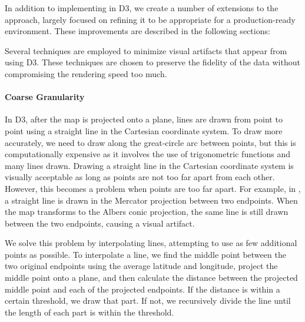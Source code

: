
In addition to implementing \cite{key:2012jenny-map} in D3, we create a number of extensions to the approach, largely focused on refining it to be appropriate for a production-ready environment.
These improvements are described in the following sections:


Several techniques are employed to minimize visual artifacts that appear from using D3.
These techniques are chosen to preserve the fidelity of the data without compromising the rendering speed too much.

\paragraph{Coarse Granularity}

In D3, after the map is projected onto a plane, lines are drawn from point to point using a straight line in the Cartesian coordinate system. To draw more accurately, we need to draw along the great-circle arc between points, but this is computationally expensive as it involves the use of trigonometric functions and many lines drawn. Drawing a straight line in the Cartesian coordinate system is visually acceptable as long as points are not too far apart from each other. However, this becomes a problem when points are too far apart. For example, in , a straight line is drawn in the Mercator projection between two endpoints. When the map transforms to the Albers conic projection, the same line is still drawn between the two endpoints, causing a visual artifact.




We solve this problem by interpolating lines, attempting to use as few additional points as possible. To interpolate a line, we find the middle point between the two original endpoints using the average latitude and longitude, project the middle point onto a plane, and then calculate the distance between the projected middle point and each of the projected endpoints. If the distance is within a certain threshold, we draw that part. If not, we recursively divide the line until the length of each part is within the threshold.

